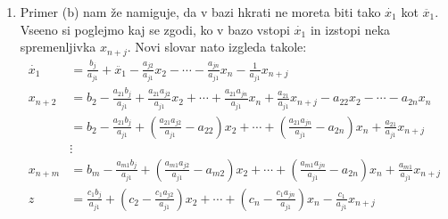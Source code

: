 \documentclass[a4paper, 10pt]{article}
\begin{document}
\begin{enumerate}[label=(\alph*)]
\item Primer (b) nam že namiguje, da v bazi hkrati ne moreta biti tako $\dot{x_1}$ kot $\ddot{x_1}$. Vseeno si poglejmo kaj se zgodi, ko v bazo vstopi $\dot{x_1}$ in izstopi neka spremenljivka $x_{n+j}$. Novi slovar nato izgleda takole:
\begin{align*}
	\dot{x_1} &= \frac{b_j}{a_{j1}} + \ddot{x_1} -\frac{a_{j2}}{a_{j1}}x_2 - \cdots - \frac{a_{jn}}{a_{j1}}x_n - \frac{1}{a_{j1}}x_{n+j} \\
	x_{n+2} &= b_2 - \frac{a_{21}b_j}{a_{j1}} + \frac{a_{21}a_{j2}}{a_{j1}}x_2 + \cdots + \frac{a_{21}a_{jn}}{a_{j1}}x_n +\frac{a_{21}}{a_{j1}}x_{n+j} - a_{22}x_2 - \cdots - a_{2n}x_n \\
	&= b_2 - \frac{a_{21}b_{j}}{a_{j1}} + (\frac{a_{21}a_{j2}}{a_{j1}} - a_{22})x_2 + \cdots + (\frac{a_{21}a_{jn}}{a_{j1}} - a_{2n})x_n + \frac{a_{21}}{a_{j1}}x_{n+j} \\
	& \vdots \\
	x_{n+m} &= b_m - \frac{a_{m1}b_{j}}{a_{j1}} + (\frac{a_{m1}a_{j2}}{a_{j1}} - a_{m2})x_2 + \cdots + (\frac{a_{m1}a_{jn}}{a_{j1}} - a_{2n})x_n + \frac{a_{m1}}{a_{j1}}x_{n+j} \\
	\hline
	z &= \frac{c_{1}b_j}{a_{j1}} + (c_2 - \frac{c_{1}a_{j2}}{a_{j1}})x_2 + \cdots + (c_n - \frac{c_{1}a_{jn}}{a_{j1}})x_n - \frac{c_1}{a_{j1}}x_{n+j}
\end{align*}


\end{enumerate}
\end{document}
